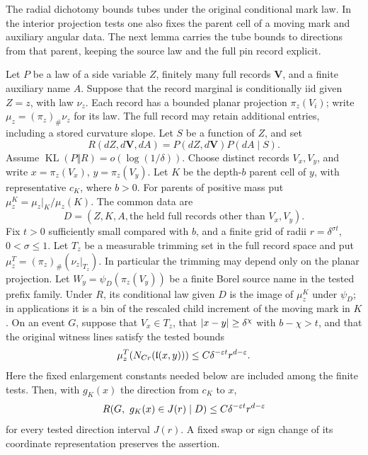 The radial dichotomy bounds tubes under the original conditional mark
law. In the interior projection tests one also fixes the parent cell of
a moving mark and auxiliary angular data. The next lemma carries the
tube bounds to directions from that parent, keeping the source law and
the full pin record explicit.

\begin{lemma}
\label{names:parent-direction-transfer}
Let \(P\) be a law of a side variable \(Z\), finitely many full
records \(\boldsymbol V\), and a finite auxiliary name \(A\).
Suppose that the record marginal is conditionally iid given \(Z=z\),
with law \(\nu_z\). Each record has a bounded planar projection
\(\pi_z(V_i)\); write \(\mu_z=(\pi_z)_\#\nu_z\) for its law.
The full record may retain additional entries, including a stored
curvature slope. Let \(S\) be a function of \(Z\), and set
\[
 R(dZ,d\boldsymbol V,dA)
   =P(dZ,d\boldsymbol V)P(dA\mid S).
\]
Assume \(\operatorname{KL}(P\Vert R)=o(\log(1/\delta))\).
Choose distinct records \(V_x,V_y\), and write
\(x=\pi_z(V_x)\), \(y=\pi_z(V_y)\).
Let \(K\) be the depth-\(b\)
parent cell of \(y\), with representative \(c_K\), where \(b>0\).
For parents of positive mass put
\(\mu_z^K=\mu_z|_K/\mu_z(K)\).
The common data are
\[
 D=(Z,K,A,\text{the held full records other than }V_x,V_y).
\]
Fix \(t>0\) sufficiently small compared with \(b\), and a finite
grid of radii \(r=\delta^{\sigma t}\), \(0<\sigma\leq1\).
Let \(T_z\) be a measurable trimming set in the full record space
and put \(\mu_z^T=(\pi_z)_\#(\nu_z|_{T_z})\).
In particular the trimming may depend only on the planar projection.
Let \(W_y=\psi_D(\pi_z(V_y))\) be a finite Borel source name in the
tested prefix family. Under \(R\), its conditional law given \(D\)
is the image of \(\mu_z^K\) under \(\psi_D\); in applications it is a
bin of the rescaled child increment of the moving mark in \(K\).
On an event \(G\), suppose that \(V_x\in T_z\), that
\(\lvert x-y\rvert\geq\delta^\chi\) with \(b-\chi>t\), and that
the original witness lines satisfy the tested bounds
\[
 \mu_z^T(N_{Cr}(\mathfrak l(x,y)))
       \leq C\delta^{-\varepsilon t}r^{d-\varepsilon}.
\]
Here the fixed enlargement constants needed below are included
among the finite tests. Then, with \(g_K(x)\) the direction from
\(c_K\) to \(x\),
\begin{equation}
 R(G,\ g_K(x)\in J(r)\mid D)
       \leq C\delta^{-\varepsilon t}r^{d-\varepsilon}
 \label{names:parent-direction-bound}
\end{equation}
for every tested direction interval \(J(r)\). A fixed swap or sign
change of its coordinate representation preserves the assertion.


\end{lemma}
